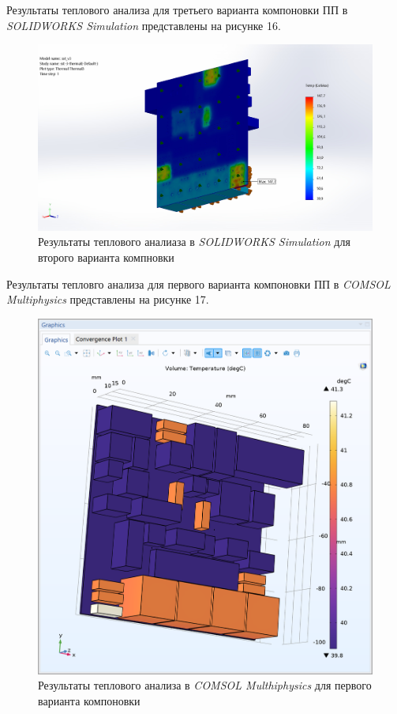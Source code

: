 Результаты теплового анализа для третьего варианта компоновки ПП в
\textit{SOLIDWORKS Simulation} представлены на рисунке 16.
\begin{figure}[H]
  \centering
  \includegraphics[scale=0.3]{../img/sst-3/thermal/sst_v3-sst-3-thermal-Thermal-Thermal3.jpg}
  \caption{Результаты теплового аналиаза в \textit{SOLIDWORKS Simulation}
    для второго варианта компновки}
\end{figure}

Результаты тепловго анализа для первого варианта компоновки ПП в
\textit{COMSOL Multiphysics} представлены на рисунке 17.
\begin{figure}[H]
  \centering
  \includegraphics[scale=0.5]{../img/scrot/Screenshot-2024-05-16-022638.png}
  \caption{Результаты теплового анализа в \textit{COMSOL Multhiphysics}
    для первого варианта компоновки}
\end{figure}

